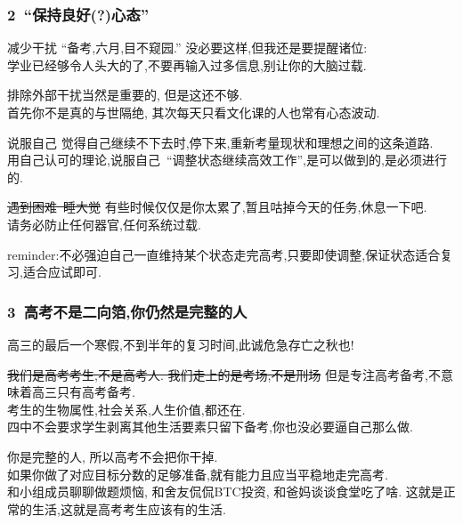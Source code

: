 \documentclass[10pt]{beamer}
\begin{document}
\begin{frame}
	\frametitle{2\ ``保持良好(?)心态''}

	\begin{block}{减少干扰}
		``备考,六月,目不窥园.'' 没必要这样,但我还是要提醒诸位:\\
		学业已经够令人头大的了,不要再输入过多信息,别让你的大脑过载.\\
	\end{block}

	\pause{} \vspace{0.3em}

	排除外部干扰当然是重要的, 但是这还不够.\\
	首先你不是真的与世隔绝, 其次每天只看文化课的人也常有心态波动.\\
	\pause{}

	\begin{block}{说服自己}
		觉得自己继续不下去时,停下来,重新考量现状和理想之间的这条道路.\\
		用自己认可的理论,说服自己\ ``调整状态继续高效工作'',是可以做到的,是必须进行的.\\
	\end{block}
	\pause{}
	\begin{block}{\sout{遇到困难\ 睡大觉}}
		有些时候仅仅是你太累了,暂且咕掉今天的任务,休息一下吧.\\
		请务必防止任何器官,任何系统过载.
	\end{block}
	reminder:\quad 不必强迫自己一直维持某个状态走完高考,只要即使调整,保证状态适合复习,适合应试即可.\\
\end{frame}

\begin{frame}
	\frametitle{3\ 高考不是二向箔,你仍然是完整的人}
	高三的最后一个寒假,不到半年的复习时间,此诚危急存亡之秋也!\\

	\pause{}
	\begin{block}{\sout{我们是高考考生,不是高考人. 我们走上的是考场,不是刑场}}
		但是专注高考备考,不意味着高三只有高考备考.\\
		考生的生物属性,社会关系,人生价值,都还在.\\
		四中不会要求学生剥离其他生活要素只留下备考,你也没必要逼自己那么做.\\
	\end{block}

	你是完整的人, 所以高考不会把你干掉.\\
	如果你做了对应目标分数的足够准备,就有能力且应当平稳地走完高考.\\
	\vspace{0.3em}
	和小组成员聊聊做题烦恼, 和舍友侃侃BTC投资, 和爸妈谈谈食堂吃了啥.
	这就是正常的生活,这就是高考考生应该有的生活.
	\vspace{1em} \pause{}
\end{frame}
\end{document}
